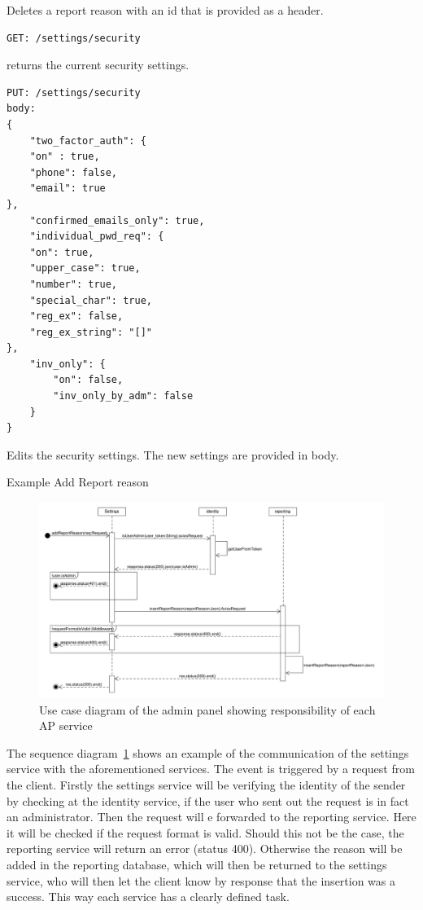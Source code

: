 Deletes a report reason with an id that is provided as a header.

\begin{verbatim}
GET: /settings/security
\end{verbatim}

returns the current security settings.

\begin{verbatim}
PUT: /settings/security
body:
{
    "two_factor_auth": {
    "on" : true,
    "phone": false,
    "email": true
},
    "confirmed_emails_only": true,
    "individual_pwd_req": {
    "on": true,
    "upper_case": true,
    "number": true,
    "special_char": true,
    "reg_ex": false,
    "reg_ex_string": "[]"
},
    "inv_only": {
        "on": false,
        "inv_only_by_adm": false
    }
}
\end{verbatim}
Edits the security settings.
The new settings are provided in body.

Example Add Report reason
\begin{figure}[!ht]
    \centering
    \includegraphics[width=1.0\textwidth]{./images/SequenceDiagram_AddReportReason.pdf}
    \caption{Use case diagram of the admin panel showing responsibility of each AP service}
    \label{fig:addReportReason}
\end{figure}
The sequence diagram~\ref{fig:addReportReason} shows an example of the communication of the settings service with the aforementioned services.
The event is triggered by a request from the client.
Firstly the settings service will be verifying the identity of the sender by checking at the identity service, if the user who sent out the request is in fact an administrator.
Then the request will e forwarded to the reporting service. Here it will be checked if the request format is valid. Should this not be the case, the reporting service will return an error (status 400).
Otherwise the reason will be added in the reporting database, which will then be returned to the settings service, who will then let the client know by response that the insertion was a success.
This way each service has a clearly defined task.

